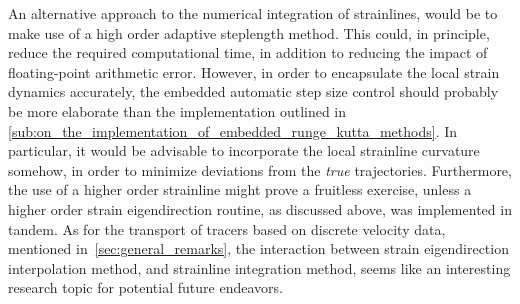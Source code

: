An alternative approach to the numerical integration of strainlines, would be
to make use of a high order adaptive steplength method. This could, in
principle, reduce the required computational time, in addition to reducing
the impact of floating-point arithmetic error. However, in order to encapsulate
the local strain dynamics accurately, the embedded automatic step size control
should probably be more elaborate than the implementation outlined in
\cref{sub:on_the_implementation_of_embedded_runge_kutta_methods}. In particular,
it would be advisable to incorporate the local strainline curvature somehow,
in order to minimize deviations from the \emph{true} trajectories. Furthermore,
the use of a higher order strainline might prove a fruitless exercise, unless
a higher order strain eigendirection routine, as discussed above, was
implemented in tandem. As for the transport of tracers based on discrete
velocity data, mentioned in~\cref{sec:general_remarks}, the interaction
between strain eigendirection interpolation method, and strainline integration
method, seems like an interesting research topic for potential future endeavors.


\vspace{\fill}
\clearpage





